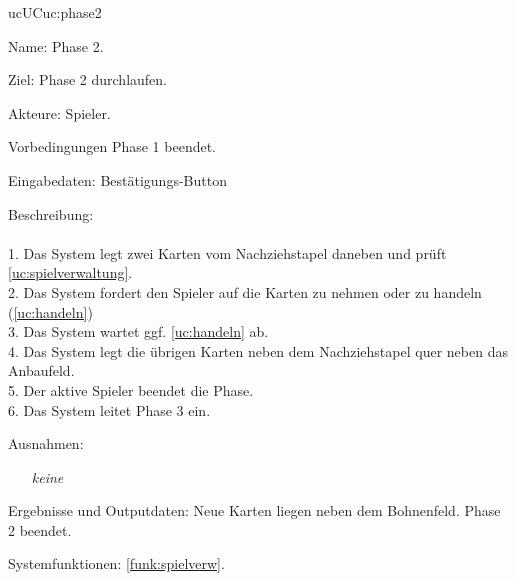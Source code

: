 \begin{description}[leftmargin=5em, style=sameline]
	\begin{lhp}{uc}{UC}{uc:phase2}
		\item [Name:] Phase 2.
		\item [Ziel:] Phase 2 durchlaufen.
		\item [Akteure:] Spieler.
		\item [Vorbedingungen] Phase 1 beendet.
		\item [Eingabedaten:] Bestätigungs-Button
		\item [Beschreibung:] \hfill\\ \hfill\\
			1. Das System legt zwei Karten vom Nachziehstapel daneben und prüft \ref{uc:spielverwaltung}.\\
			2. Das System fordert den Spieler auf die Karten zu nehmen oder zu handeln (\ref{uc:handeln})\\
			3. Das System wartet ggf. \ref{uc:handeln} ab.\\
			4. Das System legt die übrigen Karten neben dem Nachziehstapel quer neben das Anbaufeld.\\
			5. Der aktive Spieler beendet die Phase.\\
			6. Das System leitet Phase 3 ein.\\
		\item [Ausnahmen:] \hfill
			\begin{itemize} 
				\item[] \textit{keine} 
				
			\end{itemize}
		\item [Ergebnisse und Outputdaten:] Neue Karten liegen neben dem Bohnenfeld. Phase 2 beendet.
		\item [Systemfunktionen:] \ref{funk:spielverw}.
	\end{lhp}


\end{description}
